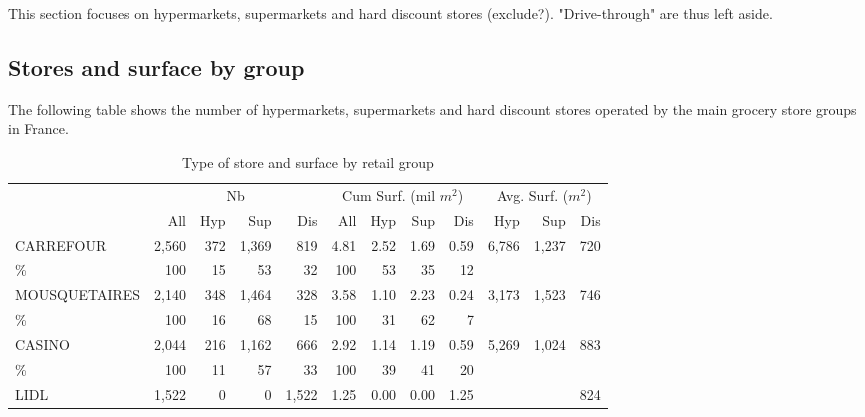 \documentclass[11pt]{article}
\begin{document}
This section focuses on hypermarkets, supermarkets and hard discount stores (exclude?). "Drive-through" are thus left aside.

\subsection{Stores and surface by group}

The following table shows the number of hypermarkets, supermarkets and hard discount stores operated by the main grocery store groups in France.

\begin{table}[H]
\caption{Type of store and surface by retail group}
\footnotesize
\setlength{\tabcolsep}{2pt}

\begin{tabular}{l|rrrr|rrrr|rrr}
\toprule
{}             & \multicolumn{4}{c|}{Nb} &   \multicolumn{4}{c|}{Cum Surf. (mil $m^2$)}   &   \multicolumn{3}{c}{Avg. Surf. ($m^2$)}\\
{}             &        All &  Hyp       &        Sup &       Dis  &      All   & Hyp        &        Sup &        Dis &      Hyp   &       Sup  &    Dis \\
\midrule
CARREFOUR      &      2,560 &        372 &      1,369 &        819 &       4.81 &       2.52 &       1.69 &       0.59 &      6,786 &      1,237 &        720 \\
\%             &        100 &         15 &         53 &         32 &        100 &         53 &         35 &         12 &            &            &            \\
MOUSQUETAIRES  &      2,140 &        348 &      1,464 &        328 &       3.58 &       1.10 &       2.23 &       0.24 &      3,173 &      1,523 &        746 \\
\%             &        100 &         16 &         68 &         15 &        100 &         31 &         62 &          7 &            &            &            \\
CASINO         &      2,044 &        216 &      1,162 &        666 &       2.92 &       1.14 &       1.19 &       0.59 &      5,269 &      1,024 &        883 \\
\%             &        100 &         11 &         57 &         33 &        100 &         39 &         41 &         20 &            &            &            \\
LIDL           &      1,522 &          0 &          0 &      1,522 &       1.25 &       0.00 &       0.00 &       1.25 &            &            &        824 \\

\end{tabular}
\end{table}
\end{document}
